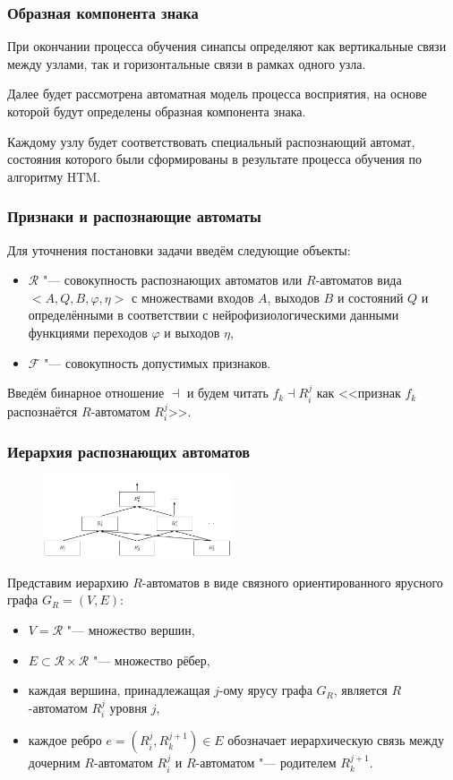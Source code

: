 \documentclass[default]{beamer}
\begin{document}
	\begin{frame}
		\frametitle{Образная компонента знака}
		
		При окончании процесса обучения синапсы определяют как вертикальные связи между узлами, так и горизонтальные связи в рамках одного узла.
		\par\bigskip
		Далее будет рассмотрена автоматная модель процесса восприятия, на основе которой будут определены образная компонента знака. 
		\par\bigskip
		Каждому узлу будет соответствовать специальный распознающий автомат, состояния которого были сформированы в результате процесса обучения по алгоритму HTM.
	\end{frame}
	
	\begin{frame}
		\frametitle{Признаки и распознающие автоматы}
		Для уточнения постановки задачи введём следующие объекты:
		\begin{itemize}
			\item 
			$\mathcal R$ "--- совокупность распознающих автоматов или $R$-автоматов вида $<A,Q,B,\varphi,\eta>$ с множествами входов $A$, выходов $B$ и состояний $Q$ и определёнными в соответствии с нейрофизиологическими данными функциями переходов $\varphi$ и выходов $\eta$,
			\item
			$\mathcal F$ "--- совокупность допустимых признаков.
		\end{itemize}
		\par\bigskip
		Введём бинарное отношение $\dashv$ и будем читать $f_k{\dashv}R_i^j$ как <<признак $f_k$ распознаётся $R$-автоматом $R_i^j$>>. 
	\end{frame}
	
	\begin{frame}
		\frametitle{Иерархия распознающих автоматов}
		\begin{figure}
			\includegraphics[width=0.5\textwidth]{rb_hierarchy}
		\end{figure}
		Представим иерархию $R$-автоматов в виде связного ориентированного ярусного графа $G_R=(V,E)$:
		\begin{itemize}
			\item 
			$V=\mathcal R$ "--- множество вершин,
			\item
			$E\subset \mathcal R\times\mathcal R$ "--- множество рёбер,
			\item 
			каждая вершина, принадлежащая $j$-ому ярусу графа $G_R$, является $R$-автоматом $R_i^j$ уровня $j$,
			\item
			каждое ребро $e=(R_i^j,R_k^{j+1}){\in}E$ обозначает иерархическую связь между дочерним $R$-автоматом $R_i^j$ и $R$-автоматом "--- родителем $R_k^{j+1}$.				
		\end{itemize}
	\end{frame}
	
\end{document}
